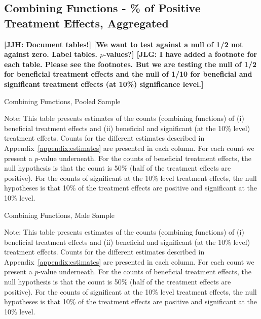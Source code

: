 \def\arraystretch{0.6}

\setlength\tabcolsep{0.3em}

\subsection{{Combining Functions - \% of Positive Treatment Effects, Aggregated}}

\noindent \textbf{[JJH: Document tables!] [We want to test against a null of 1/2 not against zero. Label tables. $p$-values?] [JLG: I have added a footnote for each table. Please see the footnotes. But we are testing the null of 1/2 for beneficial treatment effects and the null of 1/10 for beneficial and significant treatment effects (at 10\%) significance level.]}

	\begin{table}[H]
     \caption{Combining Functions, Pooled Sample} 
     \label{table:abccare_rslt_pooled_counts}
	
	\end{table}  
\begin{spacing}{1}
\begin{footnotesize}
\noindent 	Note: This table presents estimates of the counts (combining functions) of (i) beneficial treatment effects and (ii) beneficial and significant (at the 10\% level) treatment effects. Counts for the different estimates described in Appendix~\ref{appendix:estimates} are presented in each column. For each count we present a $p$-value underneath. For the counts of beneficial treatment effects, the null hypothesis is that the count is 50\% (half of the treatment effects are positive). For the counts of significant at the 10\% level treatment effects, the null hypotheses is that 10\% of the treatment effects are positive and significant at the 10\% level. 
\end{footnotesize}
\end{spacing}

	\begin{table}[H]
     \caption{Combining Functions, Male Sample} 
     \label{table:abccare_rslt_male_counts}
	
	\end{table}
\singlespacing
\begin{spacing}{1}
\begin{footnotesize}
\noindent 	Note: This table presents estimates of the counts (combining functions) of (i) beneficial treatment effects and (ii) beneficial and significant (at the 10\% level) treatment effects. Counts for the different estimates described in Appendix~\ref{appendix:estimates} are presented in each column. For each count we present a $p$-value underneath. For the counts of beneficial treatment effects, the null hypothesis is that the count is 50\% (half of the treatment effects are positive). For the counts of significant at the 10\% level treatment effects, the null hypotheses is that 10\% of the treatment effects are positive and significant at the 10\% level. 
\end{footnotesize}
\end{spacing}

